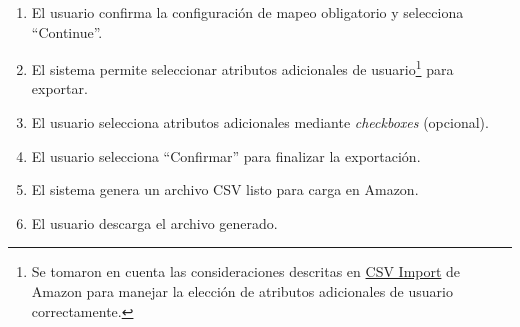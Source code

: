 \begin{enumerate}
    \item El usuario confirma la configuración de mapeo obligatorio y selecciona \enquote{Continue}.
    \item El sistema permite seleccionar atributos adicionales de usuario\footnote{Se tomaron en cuenta las consideraciones descritas en \href{https://buywithprime.amazon.com/knowledge-center/csv-import?utm_medium=website\&utm_source=direct\#standalone-product}{CSV Import} de Amazon para manejar la elección de atributos adicionales de usuario correctamente.} para exportar.
    \item El usuario selecciona atributos adicionales mediante \textit{checkboxes} (opcional).
    \item El usuario selecciona \enquote{Confirmar} para finalizar la exportación.
    \item El sistema genera un archivo CSV listo para carga en Amazon.
    \item El usuario descarga el archivo generado.
\end{enumerate}

